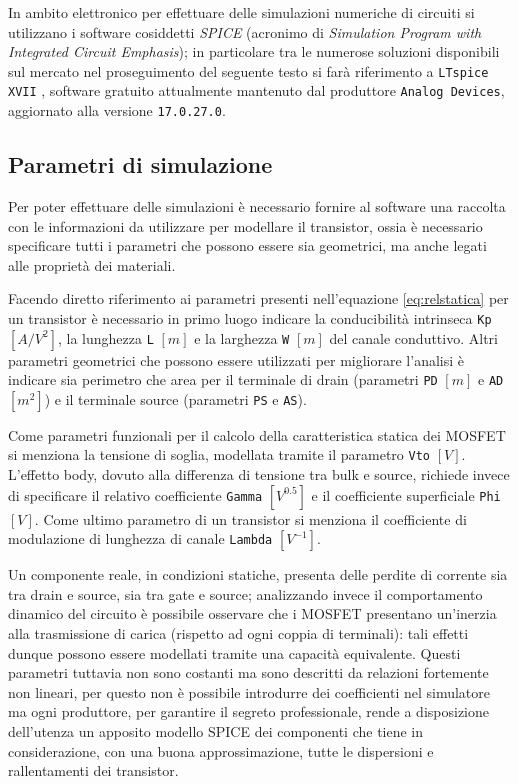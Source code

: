 	\vspace{3mm}
	
	In ambito elettronico per effettuare delle simulazioni numeriche di circuiti si utilizzano i software cosiddetti \textit{SPICE} (acronimo di \textit{Simulation Program with Integrated Circuit Emphasis}); in particolare tra le numerose soluzioni disponibili sul mercato nel proseguimento del seguente testo si farà riferimento a \texttt{LTspice XVII} \cite{ltspice}, software gratuito attualmente mantenuto dal produttore \texttt{Analog Devices}, aggiornato alla versione \texttt{17.0.27.0}.
	
\subsection{Parametri di simulazione}
	Per poter effettuare delle simulazioni è necessario fornire al software una raccolta con le informazioni da utilizzare per modellare il transistor, ossia è necessario specificare tutti i parametri che possono essere sia geometrici, ma anche legati alle proprietà dei materiali. 
	
	Facendo diretto riferimento ai parametri presenti nell'equazione \ref{eq:relstatica} per un transistor è necessario in primo luogo indicare la conducibilità intrinseca \texttt{Kp} $[A/V^2]$, la lunghezza \texttt{L} $[m]$  e la larghezza \texttt{W} $[m]$  del canale conduttivo. Altri parametri geometrici che possono essere utilizzati per migliorare l'analisi è indicare sia perimetro che area per il terminale di drain (parametri \texttt{PD} $[m]$ e \texttt{AD} $[m^2]$) e il terminale source (parametri \texttt{PS} e \texttt{AS}).
	
	Come parametri funzionali per il calcolo della caratteristica statica dei MOSFET si menziona la tensione di soglia, modellata tramite il parametro \texttt{Vto} $[V]$. L'effetto body, dovuto alla differenza di tensione tra bulk e source, richiede invece di specificare il relativo coefficiente \texttt{Gamma} $\left[V^{0.5}\right]$ e il coefficiente superficiale \texttt{Phi} $[V]$. Come ultimo parametro di un transistor si menziona il coefficiente di modulazione di lunghezza di canale \texttt{Lambda} $\left[V^{-1}\right]$.
	
	Un componente reale, in condizioni statiche, presenta delle perdite di corrente sia tra drain e source, sia tra gate e source; analizzando invece il comportamento dinamico del circuito è possibile osservare che i MOSFET presentano un'inerzia alla trasmissione di carica (rispetto ad ogni coppia di terminali): tali effetti dunque possono essere modellati tramite una capacità equivalente. Questi parametri tuttavia non sono costanti ma sono descritti da relazioni fortemente non lineari, per questo non è possibile introdurre dei coefficienti nel simulatore  ma ogni produttore, per garantire il segreto professionale, rende a disposizione dell'utenza un apposito modello SPICE dei componenti che tiene in considerazione, con una buona approssimazione, tutte le dispersioni e rallentamenti dei transistor. 	
	
